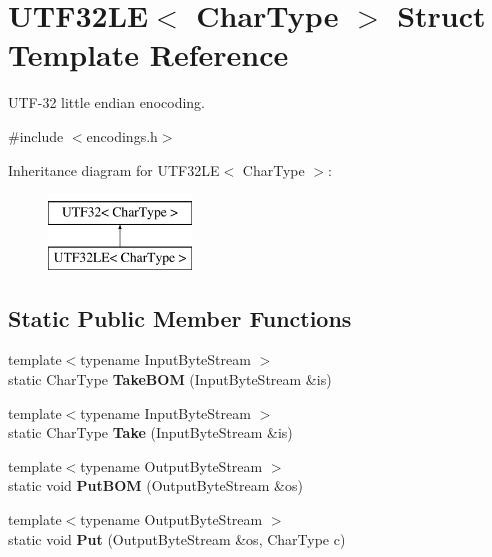\hypertarget{structUTF32LE}{}\section{U\+T\+F32\+LE$<$ Char\+Type $>$ Struct Template Reference}
\label{structUTF32LE}


U\+T\+F-\/32 little endian enocoding.  




{\ttfamily \#include $<$encodings.\+h$>$}

Inheritance diagram for U\+T\+F32\+LE$<$ Char\+Type $>$\+:\begin{figure}[H]
\begin{center}
\leavevmode
\includegraphics[height=2.000000cm]{structUTF32LE}
\end{center}
\end{figure}
\subsection*{Static Public Member Functions}
\begin{DoxyCompactItemize}
\item 
{\footnotesize template$<$typename Input\+Byte\+Stream $>$ }\\static Char\+Type {\bfseries Take\+B\+OM} (Input\+Byte\+Stream \&is)\hypertarget{structUTF32LE_a8729612b0a8b1126c61c4f8f8c34410e}{}\label{structUTF32LE_a8729612b0a8b1126c61c4f8f8c34410e}

\item 
{\footnotesize template$<$typename Input\+Byte\+Stream $>$ }\\static Char\+Type {\bfseries Take} (Input\+Byte\+Stream \&is)\hypertarget{structUTF32LE_ad13967549811be12897362bb37b2c819}{}\label{structUTF32LE_ad13967549811be12897362bb37b2c819}

\item 
{\footnotesize template$<$typename Output\+Byte\+Stream $>$ }\\static void {\bfseries Put\+B\+OM} (Output\+Byte\+Stream \&os)\hypertarget{structUTF32LE_accd97d45e55746c900dab356605825be}{}\label{structUTF32LE_accd97d45e55746c900dab356605825be}

\item 
{\footnotesize template$<$typename Output\+Byte\+Stream $>$ }\\static void {\bfseries Put} (Output\+Byte\+Stream \&os, Char\+Type c)\hypertarget{structUTF32LE_a61bb50e7fba27e3fe28a9f30eb366193}{}\label{structUTF32LE_a61bb50e7fba27e3fe28a9f30eb366193}

\end{DoxyCompactItemize}
